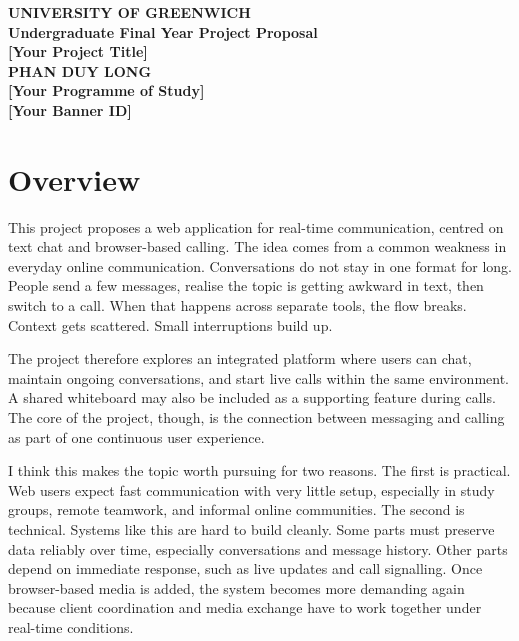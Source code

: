 \documentclass[12pt,a4paper]{article}
\begin{document}
\begin{titlepage}
    \centering
    {\Large \textbf{UNIVERSITY OF GREENWICH}}\\[1cm]
    {\Large \textbf{Undergraduate Final Year Project Proposal}}\\[2cm]
    {\huge \textbf{[Your Project Title]}}\\[2cm]
    {\Large \textbf{PHAN DUY LONG}}\\[1cm]
    {\large \textbf{[Your Programme of Study]}}\\[0.5cm]
    {\large \textbf{[Your Banner ID]}}\\[2cm]
    \vfill
\end{titlepage}

\tableofcontents
\clearpage


\section{Overview}
This project proposes a web application for real-time communication, centred on text chat and browser-based calling. The idea comes from a common weakness in everyday online communication. Conversations do not stay in one format for long. People send a few messages, realise the topic is getting awkward in text, then switch to a call. When that happens across separate tools, the flow breaks. Context gets scattered. Small interruptions build up.

The project therefore explores an integrated platform where users can chat, maintain ongoing conversations, and start live calls within the same environment. A shared whiteboard may also be included as a supporting feature during calls. The core of the project, though, is the connection between messaging and calling as part of one continuous user experience.

I think this makes the topic worth pursuing for two reasons. The first is practical. Web users expect fast communication with very little setup, especially in study groups, remote teamwork, and informal online communities. The second is technical. Systems like this are hard to build cleanly. Some parts must preserve data reliably over time, especially conversations and message history. Other parts depend on immediate response, such as live updates and call signalling. Once browser-based media is added, the system becomes more demanding again because client coordination and media exchange have to work together under real-time conditions.
\end{document}
